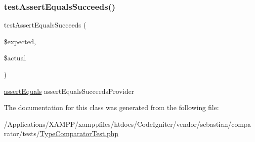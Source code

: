 \subsubsection{\texorpdfstring{test\+Assert\+Equals\+Succeeds()}{testAssertEqualsSucceeds()}}
{\footnotesize\ttfamily test\+Assert\+Equals\+Succeeds (\begin{DoxyParamCaption}\item[{}]{\$expected,  }\item[{}]{\$actual }\end{DoxyParamCaption})}

\mbox{\hyperlink{_functions_8php_a441ec5f09711b6271edda774132eec5f}{assert\+Equals}}  assert\+Equals\+Succeeds\+Provider 

The documentation for this class was generated from the following file\+:\begin{DoxyCompactItemize}
\item 
/\+Applications/\+X\+A\+M\+P\+P/xamppfiles/htdocs/\+Code\+Igniter/vendor/sebastian/comparator/tests/\mbox{\hyperlink{_type_comparator_test_8php}{Type\+Comparator\+Test.\+php}}\end{DoxyCompactItemize}
